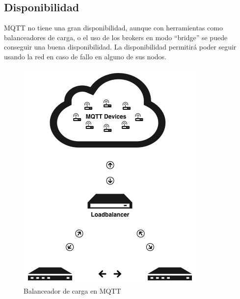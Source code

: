 \documentclass[12pt, twoside]{book}
\begin{document}
\subsection{Disponibilidad}
MQTT no tiene una gran disponibilidad, aunque con herramientas como balanceadores de carga, o el uso de los brokers en modo “bridge” se puede conseguir una buena disponibilidad. La disponibilidad permitirá poder seguir usando la red en caso de fallo en alguno de sus nodos.
\begin{figure}[h!]
\centering
\includegraphics[scale=0.3]{images/mqtt_availability.png}
\caption{Balanceador de carga en MQTT}\label{L405}
\end{figure}
\end{document}
